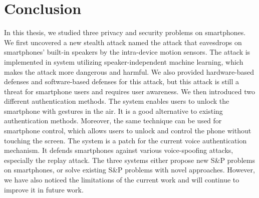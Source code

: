 \chapter{Conclusion}\label{chap:concl}
In this thesis, we studied three privacy and security problems on smartphones.
We first uncovered a new stealth attack named the {\attackName} attack that eavesdrops on smartphones' built-in speakers by the intra-device motion sensors. The attack is implemented in {\spp} system utilizing speaker-independent machine learning, which makes the attack more dangerous and harmful. We also provided hardware-based defenses and software-based defenses for this attack, but this attack is still a threat for smartphone users and requires user awareness. We then introduced two different authentication methods. The {\uu} system enables users to unlock the smartphone with gestures in the air.  It is a good alternative to existing authentication methods. Moreover, the same technique can be used for smartphone control, which allows users to unlock and control the phone without touching the screen.  The {\mv} system is a patch for the current voice authentication mechanism. It defends smartphones against various voice-spoofing attacks, especially the replay attack. The three systems either propose new S\&P problems on smartphones, or solve existing S\&P problems with novel approaches. However, we have also noticed the limitations of the current work and will continue to improve it in future work.

